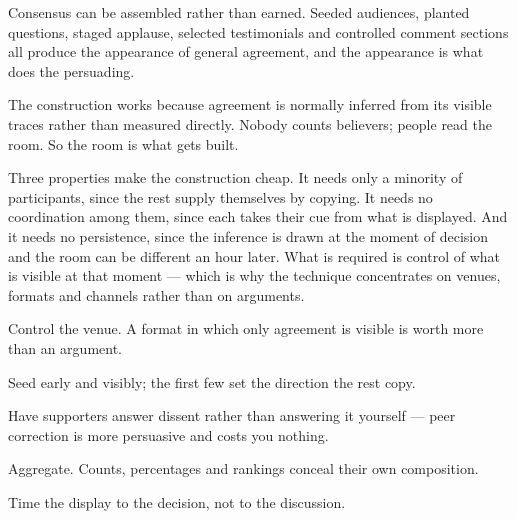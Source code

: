 


\begin{core}
Consensus can be assembled rather than earned. Seeded audiences, planted questions, staged applause, selected testimonials and controlled comment sections all produce the appearance of general agreement, and the appearance is what does the persuading.
\end{core}

\begin{mechanism}
The construction works because agreement is normally inferred from its visible traces rather than measured directly. Nobody counts believers; people read the room. So the room is what gets built.

Three properties make the construction cheap. It needs only a minority of participants, since the rest supply themselves by copying. It needs no coordination among them, since each takes their cue from what is displayed. And it needs no persistence, since the inference is drawn at the moment of decision and the room can be different an hour later. What is required is control of what is visible at that moment --- which is why the technique concentrates on venues, formats and channels rather than on arguments.
\end{mechanism}

\begin{application}
  \item Control the venue. A format in which only agreement is visible is worth more than an argument.
  \item Seed early and visibly; the first few set the direction the rest copy.
  \item Have supporters answer dissent rather than answering it yourself --- peer correction is more persuasive and costs you nothing.
  \item Aggregate. Counts, percentages and rankings conceal their own composition.
  \item Time the display to the decision, not to the discussion.
\end{application}

